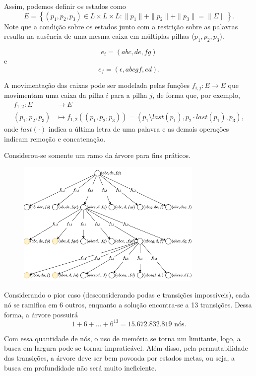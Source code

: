 \documentclass[a4paper]{report}
\begin{document}
Assim, podemos definir os estados como \[
E = \left\{ \left( p_1,p_2,p_3 \right) \in L\times L\times L : \|p_1\|+\|p_2\|+\|p_3\| = \|\Sigma\| \right\} 
.\] Note que a condição sobre os estados junto com a restrição sobre as palavras resulta na ausência de uma mesma caixa em múltiplas pilhas ($p_1,p_2,p_3$).


\[
e_i = \left( abc, de, fg \right) 
\] e \[
e_f = \left( \epsilon, abcgf, ed \right) 
.\] 


A movimentação das caixas pode ser modelada pelas funções $f_{i,j}: E \longrightarrow E$ que movimentam uma caixa da pilha $i$ para a pilha $j$, de forma que, por exemplo,
\begin{align*}
    f_{1,2}: E &\longrightarrow E \\
    \left( p_1,p_2,p_3 \right)  &\longmapsto f_{1,2}(\left( p_1,p_2,p_3 \right) ) = \left( p_1 \setminus last\left( p_1 \right), p_2\cdot last\left( p_1 \right)  , p_3 \right) 
,\end{align*}
onde $last(\cdot )$ indica a última letra de uma palavra e as demais operações indicam remoção e concatenação.


Considerou-se somente um ramo da árvore para fins práticos.

\begin{figure}[H]
    \centering
    \includegraphics[width=0.8\textwidth]{figures/lista1_6_d.png}
\end{figure}


Considerando o pior caso (desconsiderando podas e transições impossíveis), cada nó se ramifica em 6 outros, enquanto a solução encontra-se a 13 transições. Dessa forma, a árvore possuirá \[
    1 + 6 + \ldots + 6^13 = 15.672.832.819\text{ nós}
.\] 


Com essa quantidade de nós, o uso de memória se torna um limitante, logo, a busca em largura pode se tornar impraticável. Além disso, pela permutabilidade das transições, a árvore deve ser bem povoada por estados metas, ou seja, a busca em profundidade não será muito ineficiente.
\end{document}
